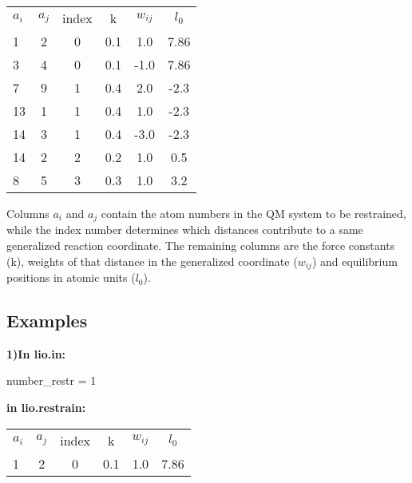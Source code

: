 \documentclass[journal=jctcce,manuscript=article]{achemso}
\begin{document}
    \begin{table}  [H]
      \begin{center}
      \begin{tabular}{ l c c c c c}
         $a_i$ & $a_j$ & index &   k  &    $w_{ij}$   &  $l_0$    \\
         1  &  2 &   0   &  0.1 &    1.0   & 7.86   \\
         3  &  4 &   0   &  0.1 &   -1.0   & 7.86   \\
         7  &  9 &   1   &  0.4 &    2.0   & -2.3   \\
         13 &  1 &   1   &  0.4 &    1.0   & -2.3   \\
         14 &  3 &   1   &  0.4 &   -3.0   & -2.3   \\
         14 &  2 &   2   &  0.2 &    1.0   & 0.5    \\
         8  &  5 &   3   &  0.3 &    1.0   & 3.2    \\
       \end{tabular}
       \end{center}
      \label{lio.restrain}
    \end{table}

Columns $a_i$ and $a_j$ contain the atom numbers in the QM system to be restrained, while the index number determines which distances contribute to a same generalized reaction coordinate. The remaining columns are the force constants (k), weights of that distance in the generalized coordinate ($w_{ij}$) and equilibrium positions in atomic units ($l_0$).

    \subsection{Examples}

    \textbf{1)In lio.in:}
    
    number\_restr = 1
    
        \textbf{in lio.restrain:}

    \begin{table}  [H]
      \begin{center}
      \begin{tabular}{ l c c c c c}
         $a_i$ & $a_j$ & index &   k  &    $w_{ij}$   &  $l_0$   \\
         1  &  2 &   0   &  0.1 &    1.0   & 7.86   \\
       \end{tabular}
       \end{center}
      \label{Tex1}
    \end{table}
\end{document}
